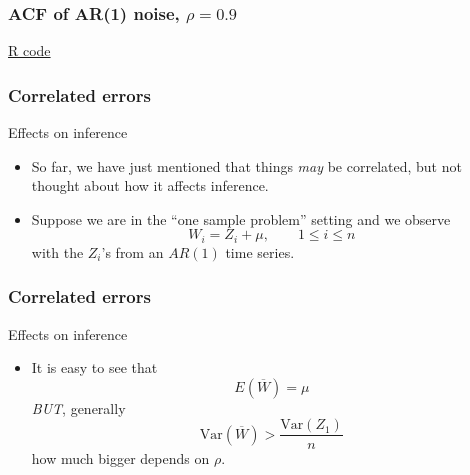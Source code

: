 \documentclass[handout]{beamer}
\begin{document}


   \begin{frame}
   \frametitle{ACF of AR(1) noise, $\rho=0.9$}
   \begin{center}
   \end{center}
   \href{http://stats191.stanford.edu/correlated_errors.html#simulating-time-series}{R code}
   \end{frame}


   \begin{frame} \frametitle{Correlated errors}

   \begin{block}
   {Effects on inference}
   \begin{itemize}
   \item So far, we have just mentioned that things {\em may} be correlated, but not thought about how it affects inference.

   \item Suppose we are in the ``one sample problem'' setting and we observe
   $$W_i  = Z_i + \mu, \qquad 1 \leq i \leq n$$
   with the $Z_i$'s from an $AR(1)$ time series.
   \end{itemize}
   \end{block}
   \end{frame}


   \begin{frame} \frametitle{Correlated errors}

   \begin{block}
   {Effects on inference}
   \begin{itemize}
   \item It is easy to see that
   $$
   E(\overline{W}) = \mu$$
   {\em BUT}, generally
   $$
   \text{Var}(\overline{W}) >  \frac{\text{Var}(Z_1)}{n}$$
   how much bigger depends on $\rho.$
   \end{itemize}
   \end{block}
   \end{frame}

\end{document}
